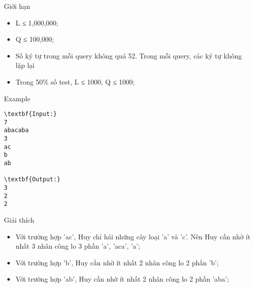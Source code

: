 Giới hạn
\begin{itemize}
	\item L ≤ 1,000,000;
	\item Q ≤ 100,000;
	\item Số ký tự trong mỗi query không quá 52. Trong mỗi query, các ký tự không lặp lại
	\item Trong 50\% số test, L ≤ 1000, Q ≤ 1000;
\end{itemize}
Example
\begin{verbatim}
\textbf{Input:}
7
abacaba
3
ac
b
ab

\textbf{Output:}
3
2
2
\end{verbatim}
Giải thích
\begin{itemize}
	\item Với trường hợp 'ac', Huy chỉ hái những cây loại 'a' và 'c'. Nên Huy cần nhờ ít nhất 3 nhân công lo 3 phần 'a', 'aca', 'a';
	\item Với trường hợp 'b', Huy cần nhờ ít nhất 2 nhân công lo 2 phần 'b';
	\item Với trường hợp 'ab', Huy cần nhờ ít nhất 2 nhân công lo 2 phần 'aba';
\end{itemize}